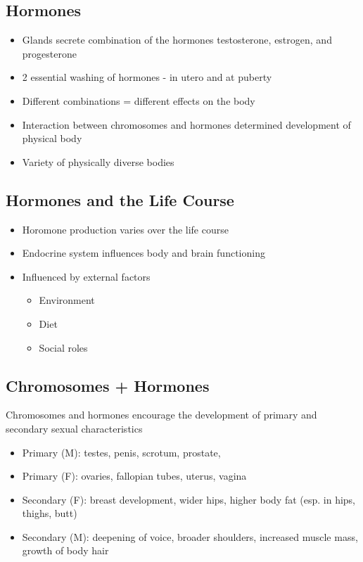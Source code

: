 \documentclass[a4paper]{article}
\begin{document}
\subsection{Hormones}
\begin{itemize}
  \item Glands secrete combination of the hormones testosterone, estrogen, and progesterone
  \item 2 essential washing of hormones - in utero and at puberty
  \item Different combinations = different effects on the body
  \item Interaction between chromosomes and hormones determined development of physical body
  \item Variety of physically diverse bodies
\end{itemize}

\subsection{Hormones and the Life Course}
\begin{itemize}
  \item Horomone production varies over the life course
  \item Endocrine system influences body and brain functioning
  \item Influenced by external factors \begin{itemize}
    \item Environment
    \item Diet
    \item Social roles
  \end{itemize}
\end{itemize}

\subsection{Chromosomes + Hormones}
Chromosomes and hormones encourage the development of primary and secondary sexual characteristics
\begin{itemize}
  \item Primary (M): testes, penis, scrotum, prostate,
  \item Primary (F): ovaries, fallopian tubes, uterus, vagina
  \item Secondary (F): breast development, wider hips, higher body fat (esp. in hips, thighs, butt)
  \item Secondary (M): deepening of voice, broader shoulders, increased muscle mass, growth of body hair
\end{itemize}
\end{document}
